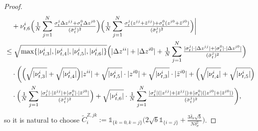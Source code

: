 \documentclass[10pt,a4paper]{article}
\theoremstyle{plain}
\theoremstyle{definition}
\numberwithin{equation}{section}
\begin{document}
\begin{proof}
\begin{align*}
&\ \ \ + \nu_{t,6}^{i}\Bigl(\tfrac{1}{N}\sum_{j=1}^{N}\tfrac{\sigma_{t}^{j}\Delta z^{jj}+\sigma_{t}^{0}\Delta z^{j0}}{(\bar{\sigma}_{t}^{j})^{2}}\Bigr)\Bigl(\tfrac{1}{N}\sum_{j=1}^{N}\tfrac{\sigma_{t}^{j}(z^{jj}+\bar{z}^{jj})+\sigma_{t}^{0}(z^{j0}+\bar{z}^{j0})}{(\bar{\sigma}_{t}^{j})^{2}}\Bigr)\bigg| \\
&\leq \sqrt{\max\{|\nu_{t,3}^{i}|,|\nu_{t,4}^{i}|,|\nu_{t,5}^{i}|,|\nu_{t,6}^{i}|\}}\Bigl(|\Delta z^{ii}| + |\Delta z^{i0}| + \tfrac{1}{N}\sum_{j=1}^{N}\tfrac{|\sigma_{t}^{j}| \cdot |\Delta z^{jj}|+|\sigma_{t}^{0}| \cdot |\Delta z^{j0}|}{(\bar{\sigma}_{t}^{j})^{2}}\Bigr) \\
&\ \ \ \cdot \biggl(\Bigl(\sqrt{|\nu_{t,3}^{i}|}+\sqrt{|\nu_{t,4}^{i}|}\Bigr)|z^{ii}| + \sqrt{|\nu_{t,5}^{i}|} \cdot |z^{i0}| + \sqrt{|\nu_{t,3}^{i}|} \cdot |\bar{z}^{i0}| + \Bigl(\sqrt{|\nu_{t,4}^{i}|}+\sqrt{|\nu_{t,5}^{i}|}\Bigr)\\
&\ \ \ \cdot\Bigl(\tfrac{1}{N}\sum_{j=1}^{N}\tfrac{|\sigma_{t}^{j}| \cdot |\bar{z}^{jj}|+|\sigma_{t}^{0}| \cdot |\bar{z}^{j0}|}{(\bar{\sigma}_{t}^{j})^{2}}\Bigr) + \sqrt{|\nu_{t,6}^{i}|} \cdot \tfrac{1}{N}\sum_{j=1}^{N}\tfrac{|\sigma_{t}^{j}|(|z^{jj}|+|\bar{z}^{jj}|)+|\sigma_{t}^{0}|(|z^{j0}|+|\bar{z}^{j0}|)}{(\bar{\sigma}_{t}^{j})^{2}}\biggr),
\end{align*}
so it is natural to choose $\tilde{C}_{i}^{Z,jk}:= \mathds{1}_{\{k=0,k=j\}}\bigl(2\sqrt{b}\mathds{1}_{\{i=j\}} + \tfrac{3\bar{\delta}_{\sigma}\sqrt{b}}{N\delta_{\sigma}^{2}}\bigr)$.

\end{proof}
\end{document}
